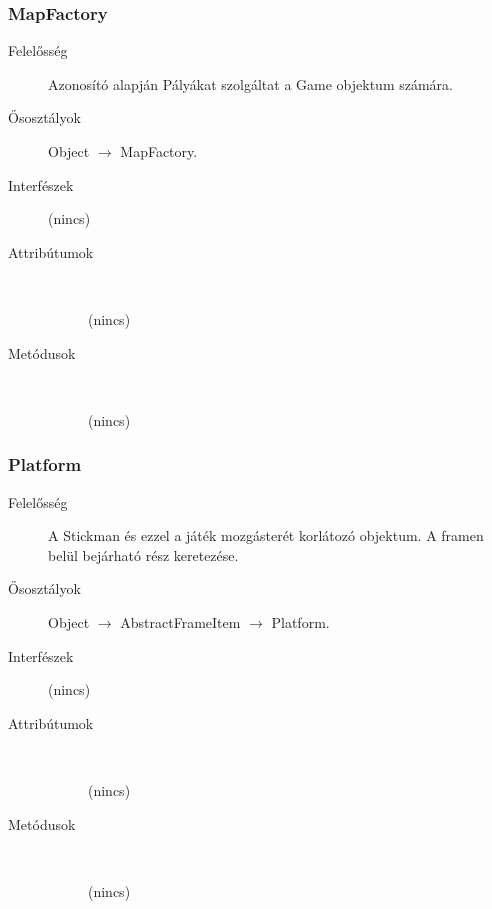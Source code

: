 		\subsubsection{MapFactory}
		\begin{description}
		\item[Felelősség]
		Azonosító alapján Pályákat szolgáltat a Game objektum számára.
		\item[Ősosztályok] Object $\rightarrow{}$ MapFactory.
		\item[Interfészek] (nincs)
		\item[Attribútumok]$\ $
		\begin{description}
		\item[] (nincs)
		\end{description}
		\item[Metódusok]$\ $
		\begin{description}
		\item[] (nincs)
		\end{description}
		\end{description}
		
		\subsubsection{Platform}
		\begin{description}
		\item[Felelősség]
		A Stickman és ezzel a játék mozgásterét korlátozó objektum. A framen belül bejárható rész keretezése.
		\item[Ősosztályok] Object $\rightarrow{}$ AbstractFrameItem $\rightarrow{}$ Platform.
		\item[Interfészek] (nincs)
		\item[Attribútumok]$\ $
		\begin{description}
		\item[] (nincs)
		\end{description}
		\item[Metódusok]$\ $
		\begin{description}
		\item[] (nincs)
		\end{description}
		\end{description}
		
